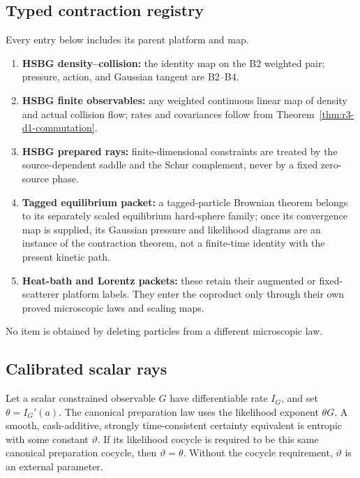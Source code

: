 \subsection{Typed contraction registry}

Every entry below includes its parent platform and map.
\begin{enumerate}[label=(\alph*)]
\item \textbf{HSBG density--collision:} the identity map on the B2 weighted
      pair; pressure, action, and Gaussian tangent are B2--B4.
\item \textbf{HSBG finite observables:} any weighted continuous linear map of
      density and actual collision flow; rates and covariances follow from
      Theorem~\ref{thm:r3-d1-commutation}.
\item \textbf{HSBG prepared rays:} finite-dimensional constraints are treated
      by the source-dependent saddle and the Schur complement, never by a
      fixed zero-source phase.
\item \textbf{Tagged equilibrium packet:} a tagged-particle Brownian theorem
      belongs to its separately scaled equilibrium hard-sphere family; once
      its convergence map is supplied, its Gaussian pressure and likelihood
      diagrams are an instance of the contraction theorem, not a finite-time
      identity with the present kinetic path.
\item \textbf{Heat-bath and Lorentz packets:} these retain their augmented or
      fixed-scatterer platform labels.  They enter the coproduct only through
      their own proved microscopic laws and scaling maps.
\end{enumerate}
No item is obtained by deleting particles from a different microscopic law.

\subsection{Calibrated scalar rays}

\begin{theorem}
\label{thm:r3-d1-calibration}
Let a scalar constrained observable \(G\) have differentiable rate
\(I_G\), and set \(\theta=I_G'(a)\).  The canonical preparation law uses the
likelihood exponent \(\theta G\).  A smooth, cash-additive, strongly
time-consistent certainty equivalent is entropic with some constant
\(\vartheta\).  If its likelihood cocycle is required to be this same
canonical preparation cocycle, then \(\vartheta=\theta\).  Without the
cocycle requirement, \(\vartheta\) is an external parameter.
\end{theorem}


